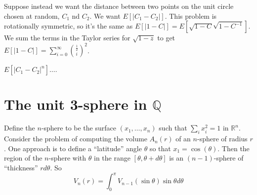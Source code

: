 \documentclass{article}
\begin{document}
Suppose instead we want the distance between two points on the unit circle chosen at random, $C_1$ nd $C_2$.
We want $E[|C_1-C_2|]$.
This problem is rotationally symmetric, so it's the same as $E[|1-C|]=E[\sqrt{1-C}\sqrt{1-C^{-1}}]$.
We sum the terms in the Taylor series for $\sqrt{1-z}$ to get
$E[|1-C|]=\sum_{i=0}^\infty{\frac{1}{2} \choose i}^2$.

$E[|C_1-C_2|^n]\ldots$.

\section{The unit 3-sphere in $\mathbb{Q}$}
Define the $n$-sphere to be the surface $(x_1,\ldots,x_n)$ such that $\sum_ix_i^2=1$ in $\mathbb{R}^n$.
Consider the problem of computing the volume $A_n(r)$ of an $n$-sphere of radius $r$.
One approach is to define a ``latitude'' angle $\theta$ so that $x_1=\cos(\theta)$.
Then the region of the $n$-sphere with $\theta$ in the range $[\theta,\theta+d\theta]$ is an $(n-1)$-sphere of ``thickness'' $rd\theta$. So
\[
V_n(r) = \int_0^\pi V_{n-1}(\sin\theta)\sin\theta d\theta
\]
\end{document}
